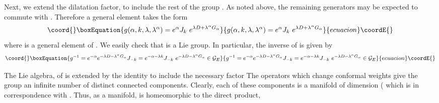 \documentclass[a4paper,12pt]{article}
\begin{document}
Next, we extend the dilatation factor, \coordHE{} to include the rest
of the group \coordHE{}. As noted above, the remaining generators \coordHE{} may be expected to commute with \coordHE{}. Therefore a general
element \coordHE{} takes the form 
\begin{equation}\coord{}\boxEquation{
g(\alpha ,k,\lambda ,\lambda ^{\alpha })=e^{\alpha }J_{k}\ e^{\lambda
D+\lambda ^{\alpha }G_{\alpha }}  \label{Extended group element}
}{
g(\alpha ,k,\lambda ,\lambda ^{\alpha })=e^{\alpha }J_{k}\ e^{\lambda
D+\lambda ^{\alpha }G_{\alpha }}  }{ecuacion}\coordE{}\end{equation}
where \coordHE{} is a general element of \coordHE{}. We easily check that \coordHE{} is a Lie group. In
particular, the inverse of \coordHE{} is given by 
\begin{equation}\coord{}\boxEquation{
g^{-1}=e^{-\alpha }e^{-\lambda D-\lambda ^{\alpha }G_{\alpha
}}J_{-k}=e^{-\alpha -\lambda k}J_{-k}\ e^{-\lambda D-\lambda ^{\alpha
}G_{\alpha }}\in \mathcal{G}_{E}
}{
g^{-1}=e^{-\alpha }e^{-\lambda D-\lambda ^{\alpha }G_{\alpha
}}J_{-k}=e^{-\alpha -\lambda k}J_{-k}\ e^{-\lambda D-\lambda ^{\alpha
}G_{\alpha }}\in \mathcal{G}_{E}
}{ecuacion}\coordE{}\end{equation}

The Lie algebra, \coordHE{} of \coordHE{} is \coordHE{} extended by the identity to include the necessary factor \coordHE{} The \coordHE{} operators
which change conformal weights give the group an infinite number of distinct
connected components. Clearly, each of these components is a manifold of
dimension (\coordHE{} which is in \coordHE{} correspondence with \coordHE{}. Thus, as a manifold, \coordHE{} is
homeomorphic to the direct product, \coordHE{}
\end{document}
